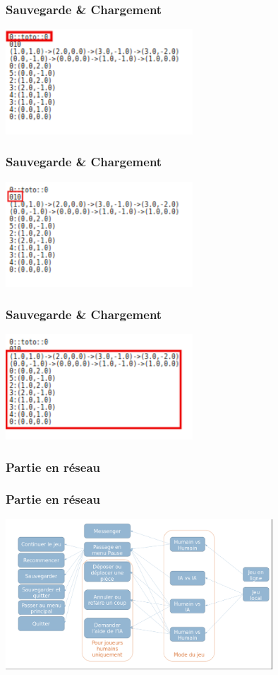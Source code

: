 \documentclass{beamer}
\begin{document}
    \begin{frame}
      \frametitle{Sauvegarde \& Chargement}
      \includegraphics[width=7cm]{./chargeGen.png}
    \end{frame}
    \begin{frame}
      \frametitle{Sauvegarde \& Chargement}
      \includegraphics[width=7cm]{./chargeIns.png}
    \end{frame}
    \begin{frame}
      \frametitle{Sauvegarde \& Chargement}
      \includegraphics[width=7cm]{./chargeCoup.png}
    \end{frame}
    \begin{frame}
        \frametitle{Partie en r\'eseau}
    \end{frame}
    \begin{frame}
        \frametitle{Partie en r\'eseau}
        \includegraphics[width=10cm]{deroulementPartie.png}
    \end{frame}
\end{document}
